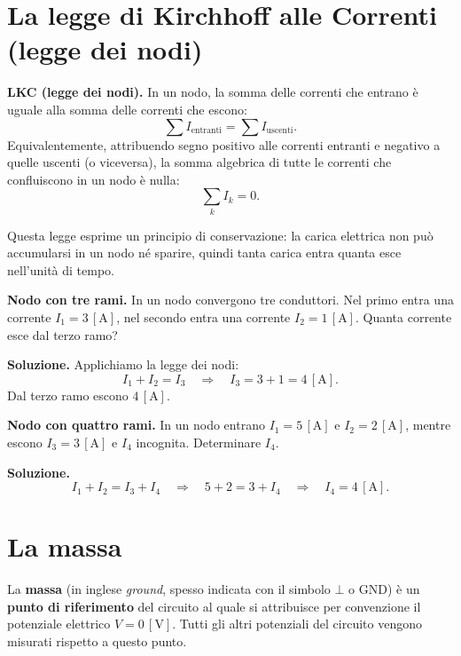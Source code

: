 \section{La legge di Kirchhoff alle Correnti (legge dei nodi)}
\begin{concetto}
\textbf{LKC (legge dei nodi).} In un nodo, la somma delle correnti che entrano è uguale alla somma delle correnti che escono:
\[
\sum I_{\text{entranti}} = \sum I_{\text{uscenti}}.
\]
Equivalentemente, attribuendo segno positivo alle correnti entranti e negativo a quelle uscenti (o viceversa), la somma algebrica di tutte le correnti che confluiscono in un nodo è nulla:
\[
\sum_k I_k = 0.
\]
\end{concetto}

Questa legge esprime un principio di conservazione: la carica elettrica non può accumularsi in un nodo né sparire, quindi tanta carica entra quanta esce nell'unità di tempo.

\begin{esempio}
\textbf{Nodo con tre rami.} In un nodo convergono tre conduttori. Nel primo entra una corrente \(I_1 = 3\,[\text{A}]\), nel secondo entra una corrente \(I_2 = 1\,[\text{A}]\). Quanta corrente esce dal terzo ramo?

\smallskip
\textbf{Soluzione.} Applichiamo la legge dei nodi:
\[
I_1 + I_2 = I_3 \quad \Longrightarrow \quad I_3 = 3 + 1 = 4\,[\text{A}].
\]
Dal terzo ramo escono \(4\,[\text{A}]\).
\end{esempio}

\begin{esempio}
\textbf{Nodo con quattro rami.} In un nodo entrano \(I_1 = 5\,[\text{A}]\) e \(I_2 = 2\,[\text{A}]\), mentre escono \(I_3 = 3\,[\text{A}]\) e \(I_4\) incognita. Determinare \(I_4\).

\smallskip
\textbf{Soluzione.}
\[
I_1 + I_2 = I_3 + I_4 \quad \Longrightarrow \quad 5 + 2 = 3 + I_4 \quad \Longrightarrow \quad I_4 = 4\,[\text{A}].
\]
\end{esempio}


\section{La massa}

\begin{concetto}
La \textbf{massa} (in inglese \textit{ground}, spesso indicata con il simbolo \(\bot\) o GND) è un \textbf{punto di riferimento} del circuito al quale si attribuisce per convenzione il potenziale elettrico \(V = 0\,[\text{V}]\). Tutti gli altri potenziali del circuito vengono misurati rispetto a questo punto.
\end{concetto}

